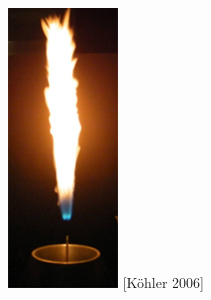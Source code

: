 \documentclass{beamer}
\begin{document}
\begin{frame}
\begin{minipage}[0.5\textheight]{\textwidth}
\begin{columns}[T]
\begin{column}{0.3\textwidth}
\vspace{0pt}
\includegraphics[height=1.4\textwidth]{./figs/dlrflame.png}
\newline
\tiny
[K{\"o}hler 2006] \cite{AdelaideISF}
\end{column}
\end{columns}
\end{minipage}
\end{frame}

\end{document}
